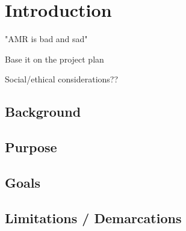 \chapter{Introduction}
"AMR is bad and sad"

Base it on the project plan

Social/ethical considerations??

\section{Background}

\section{Purpose}

\section{Goals}

\section{Limitations / Demarcations}

